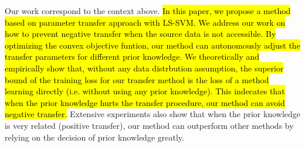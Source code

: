 Our work correspond to the context above. \hl{In this paper, we propose a method based on parameter transfer approach with LS-SVM. We address our work on how to prevent negative transfer when the source data is not accessible. By optimizing the convex objective funtion, our method can autonomously adjust the transfer parameters for different prior knowledge. We theoretically and empirically show that, without any data distrbution assumption, the superior bound of the training loss for our transfer method is the loss of a method learning directly (i.e. without using any prior knowledge). This indecates that when the prior knowledge hurts the transfer procedure, our method can avoid negative transfer.} Extensive experiments also show that when the prior knowledge is very related (positive transfer), our method can outperform other methods by relying on the decision of prior knowledge greatly.

